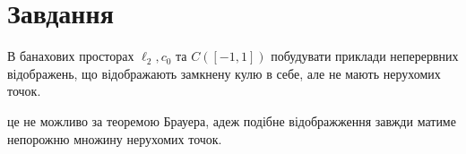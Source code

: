 
\chapter{Завдання \theHchapter}

\begin{tcolorbox}[title=Завдання]
    В банахових просторах $\ell_{2}, c_{0}$ та $C([-1,1])$ 
    побудувати приклади неперервних відображень, 
    що відображають замкнену кулю в себе, але не мають нерухомих точок.

\end{tcolorbox}



це не можливо за теоремою Брауера, адеж подібне відображження завжди матиме
непорожню множину нерухомих точок.